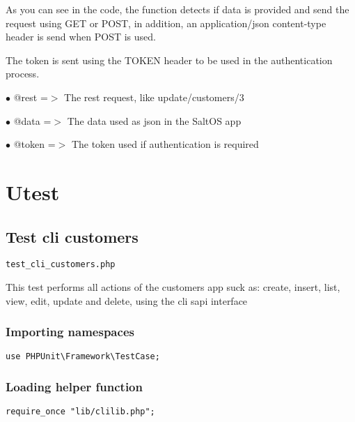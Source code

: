 \documentclass[a4paper]{book}
\begin{document}
As you can see in the code, the function detects if data is provided and send the request
using GET or POST, in addition, an application/json content-type header is send when POST
is used.

The token is sent using the TOKEN header to be used in the authentication process.

\begin{compactitem}
\item[\color{myblue}$\bullet$] @rest  =$>$ The rest request, like update/customers/3
\item[\color{myblue}$\bullet$] @data  =$>$ The data used as json in the SaltOS app
\item[\color{myblue}$\bullet$] @token =$>$ The token used if authentication is required
\end{compactitem}


\hypertarget{toc8}{}
\chapter{Utest}

\hypertarget{toc9}{}
\section{Test cli customers}

\begin{lstlisting}
test_cli_customers.php
\end{lstlisting}

This test performs all actions of the customers app suck as: create, insert,
list, view, edit, update and delete, using the cli sapi interface

\hypertarget{toc10}{}
\subsection{Importing namespaces}

\begin{lstlisting}
use PHPUnit\Framework\TestCase;
\end{lstlisting}

\hypertarget{toc11}{}
\subsection{Loading helper function}

\begin{lstlisting}
require_once "lib/clilib.php";
\end{lstlisting}
\end{document}
